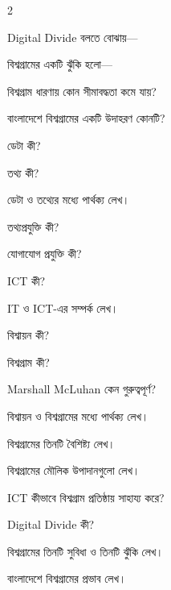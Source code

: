 \begin{topicbody}
\begin{multicols}{2}
\begin{compactenum}
\item \begin{minipage}[t]{\linewidth}Digital Divide বলতে বোঝায়—\par {}\par\end{minipage}

\item \begin{minipage}[t]{\linewidth}বিশ্বগ্রামের একটি ঝুঁকি হলো—\par {}\par\end{minipage}

\item \begin{minipage}[t]{\linewidth}বিশ্বগ্রাম ধারণায় কোন সীমাবদ্ধতা কমে যায়?\par {}\par\end{minipage}

\item \begin{minipage}[t]{\linewidth}বাংলাদেশে বিশ্বগ্রামের একটি উদাহরণ কোনটি?\par {}\par\end{minipage}
\end{compactenum}\end{multicols}

\begin{compactenum}
\item ডেটা কী?
\item তথ্য কী?
\item ডেটা ও তথ্যের মধ্যে পার্থক্য লেখ।
\item তথ্যপ্রযুক্তি কী?
\item যোগাযোগ প্রযুক্তি কী?
\item ICT কী?
\item IT ও ICT-এর সম্পর্ক লেখ।
\item বিশ্বায়ন কী?
\item বিশ্বগ্রাম কী?
\item Marshall McLuhan কেন গুরুত্বপূর্ণ?
\item বিশ্বায়ন ও বিশ্বগ্রামের মধ্যে পার্থক্য লেখ।
\item বিশ্বগ্রামের তিনটি বৈশিষ্ট্য লেখ।
\item বিশ্বগ্রামের মৌলিক উপাদানগুলো লেখ।
\item ICT কীভাবে বিশ্বগ্রাম প্রতিষ্ঠায় সাহায্য করে?
\item Digital Divide কী?
\item বিশ্বগ্রামের তিনটি সুবিধা ও তিনটি ঝুঁকি লেখ।
\item বাংলাদেশে বিশ্বগ্রামের প্রভাব লেখ।
\end{compactenum}


\end{topicbody}
